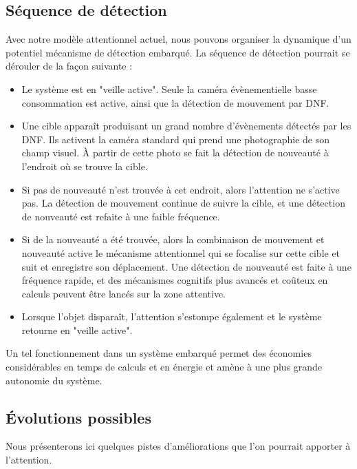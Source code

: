 	\subsection{Séquence de détection}

	Avec notre modèle attentionnel actuel, nous pouvons organiser la dynamique d'un potentiel mécanisme de détection embarqué. La séquence de détection pourrait se dérouler de la façon suivante : 

	\begin{itemize}
		\item Le système est en "veille active". Seule la caméra évènementielle basse consommation est active, ainsi que la détection de mouvement par DNF.
		\item Une cible apparaît produisant un grand nombre d'évènements détectés par les DNF. Ils activent la caméra standard qui prend une photographie de son champ visuel. À partir de cette photo se fait la détection de nouveauté à l'endroit où se trouve la cible.
		\item Si pas de nouveauté n'est trouvée à cet endroit, alors l'attention ne s'active pas. La détection de mouvement continue de suivre la cible, et une détection de nouveauté est refaite à une faible fréquence.
		\item Si de la nouveauté a été trouvée, alors la combinaison de mouvement et nouveauté active le mécanisme attentionnel qui se focalise sur cette cible et suit et enregistre son déplacement. Une détection de nouveauté est faite à une fréquence rapide, et des mécanismes cognitifs plus avancés et coûteux en calculs peuvent être lancés sur la zone attentive.
		\item Lorsque l'objet disparaît, l'attention s'estompe également et le système retourne en "veille active".
	\end{itemize}

	Un tel fonctionnement dans un système embarqué permet des économies considérables en temps de calculs et en énergie et amène à une plus grande autonomie du système.

	\subsection{Évolutions possibles}

	Nous présenterons ici quelques pistes d'améliorations que l'on pourrait apporter à l'attention.

